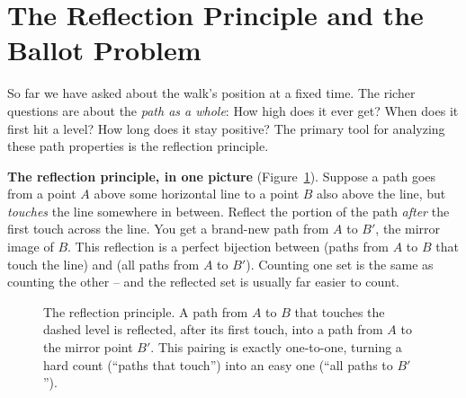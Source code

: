 \section{The Reflection Principle and the Ballot Problem}
\label{ch26:reflection}

So far we have asked about the walk's position at a fixed time. The richer
questions are about the \emph{path as a whole}: How high does it ever get? When
does it first hit a level? How long does it stay positive? The primary tool for
analyzing these path properties is the reflection principle.

\begin{intuitionbox}
\textbf{The reflection principle, in one picture}
(Figure~\ref{ch26:fig-reflection}). Suppose a path goes from a
point $A$ above some horizontal line to a point $B$ also above the line, but
\emph{touches} the line somewhere in between. Reflect the portion of the path
\emph{after} the first touch across the line. You get a brand-new path from $A$
to $B'$, the mirror image of $B$. This reflection is a perfect bijection
between (paths from $A$ to $B$ that touch the line) and (all paths from $A$ to
$B'$). Counting one set is the same as counting the other -- and the reflected
set is usually far easier to count.
\end{intuitionbox}

\begin{figure}[H]
\centering
{}
\caption{The reflection principle. A path from $A$ to $B$ that touches the
dashed level is reflected, after its first touch, into a path from $A$ to the
mirror point $B'$. This pairing is exactly one-to-one, turning a hard count
(``paths that touch'') into an easy one (``all paths to $B'$'').}
\label{ch26:fig-reflection}
\end{figure}

